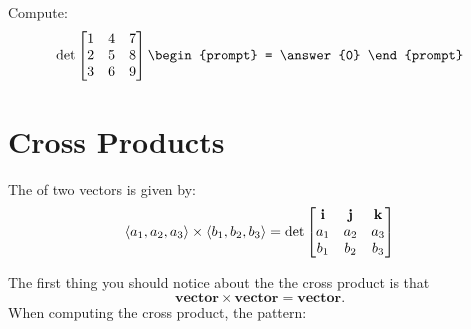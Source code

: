 \documentclass{ximera}
\begin{document}
\begin{question}
  Compute:
  \[
  \det
  \begin{bmatrix} 
    1 & 4 & 7\\
    2 & 5 & 8\\
    3 & 6 & 9\\
  \end{bmatrix}
  \begin{prompt}
    = \answer{0}
  \end{prompt}
  \]
\end{question}








\section{Cross Products}

\begin{definition}
  The  of two vectors is given by: 
  \[
  \left\langle a_1,a_2,a_3\right\rangle \times \left\langle b_1,b_2,b_3\right\rangle = \det
  \begin{bmatrix}
    \mathbf{i} & \mathbf{j} & \mathbf{k}\\
    a_1 & a_2 & a_3\\
    b_1 & b_2 & b_3
  \end{bmatrix}
  \]
\end{definition}
The first thing you should notice about the the cross product is that
\[
\mathbf{vector}\times \mathbf{vector} = \mathbf{vector}.
\]
  When computing the cross product, the pattern:
\end{document}
